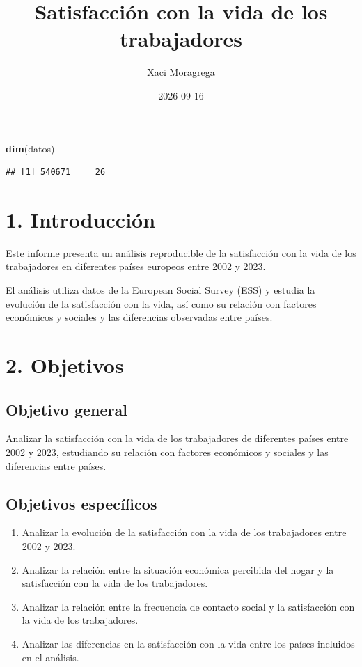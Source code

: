\documentclass[
]{article}
\title{Satisfacción con la vida de los trabajadores}
\author{Xaci Moragrega}
\date{2026-09-16}
\newenvironment{Shaded}{\begin{snugshade}}{\end{snugshade}}
\newcommand{\FunctionTok}[1]{\textcolor[rgb]{0.13,0.29,0.53}{\textbf{#1}}}
\newcommand{\NormalTok}[1]{#1}
\begin{document}
\maketitle

\begin{Shaded}
\begin{Highlighting}[]
\FunctionTok{dim}\NormalTok{(datos)}
\end{Highlighting}
\end{Shaded}

\begin{verbatim}
## [1] 540671     26
\end{verbatim}

\section{1. Introducción}\label{introducciuxf3n}

Este informe presenta un análisis reproducible de la satisfacción con la
vida de los trabajadores en diferentes países europeos entre 2002 y
2023.

El análisis utiliza datos de la European Social Survey (ESS) y estudia
la evolución de la satisfacción con la vida, así como su relación con
factores económicos y sociales y las diferencias observadas entre
países.

\section{2. Objetivos}\label{objetivos}

\subsection{Objetivo general}\label{objetivo-general}

Analizar la satisfacción con la vida de los trabajadores de diferentes
países entre 2002 y 2023, estudiando su relación con factores económicos
y sociales y las diferencias entre países.

\subsection{Objetivos específicos}\label{objetivos-especuxedficos}

\begin{enumerate}
\def\labelenumi{\arabic{enumi}.}
\item
  Analizar la evolución de la satisfacción con la vida de los
  trabajadores entre 2002 y 2023.
\item
  Analizar la relación entre la situación económica percibida del hogar
  y la satisfacción con la vida de los trabajadores.
\item
  Analizar la relación entre la frecuencia de contacto social y la
  satisfacción con la vida de los trabajadores.
\item
  Analizar las diferencias en la satisfacción con la vida entre los
  países incluidos en el análisis.
\end{enumerate}
\end{document}
